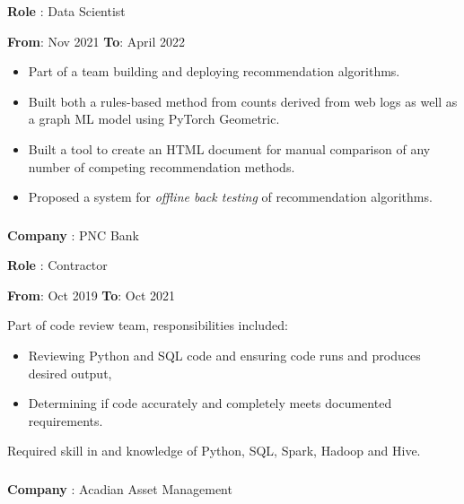 \documentclass[
]{article}
\providecommand{\tightlist}{%
  \setlength{\itemsep}{0pt}\setlength{\parskip}{0pt}}
\begin{document}
{{\begin{flushleft}
\textbf{Role} : Data Scientist
\end{flushleft}
{\textbf{From}: Nov 2021 \hspace{0.5in}  \textbf{To}: April 2022}
\begin{itemize}
\tightlist
\item
  Part of a team building and deploying recommendation algorithms.
\item
  Built both a rules-based method from counts derived from web logs as
  well as a graph ML model using PyTorch Geometric.
\item
  Built a tool to create an HTML document for manual comparison of any
  number of competing recommendation methods.
\item
  Proposed a system for \emph{offline back testing} of recommendation
  algorithms.
\end{itemize}


\hypertarget{pnc}{\subsubsection{}\label{pnc}}
\begin{flushleft}
\textbf{Company} : PNC Bank
\end{flushleft}

\begin{flushleft}
\textbf{Role} : Contractor
\end{flushleft}

\textbf{From}: Oct 2019 \hspace{0.5in} \textbf{To}: Oct 2021

Part of code review team, responsibilities included:

\begin{itemize}
\tightlist
\item
  Reviewing Python and SQL code and ensuring code runs and produces
  desired output,
\item
  Determining if code accurately and completely meets documented
  requirements.
\end{itemize}
Required skill in and knowledge of Python, SQL, Spark, Hadoop and Hive.


\hypertarget{acadian}{\subsubsection{}\label{acadian}}
\begin{flushleft}
\textbf{Company} : Acadian Asset Management
\end{flushleft}

}}
\end{document}
